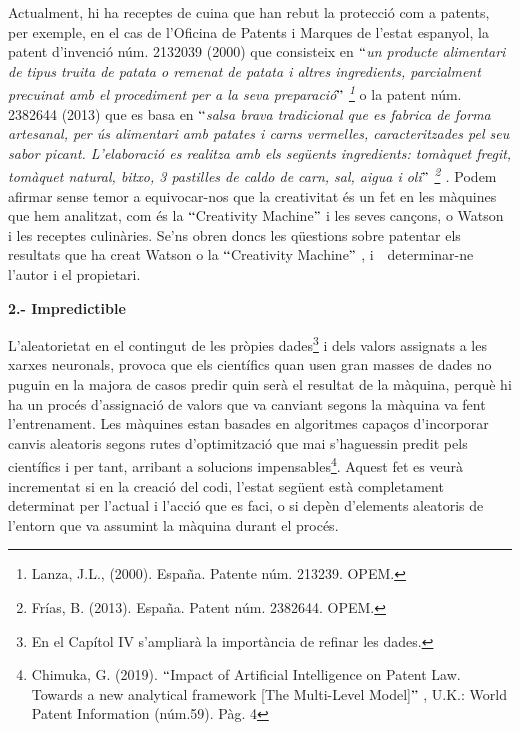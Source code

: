 \documentclass[12pt]{article}
\begin{document}
\vspace{\baselineskip}
Actualment, hi ha receptes de cuina que han rebut la protecció com a patents, per exemple, en el cas de l’Oficina de Patents i Marques de l’estat espanyol, la patent d’invenció núm. 2132039 (2000) que consisteix en \textit{$``$un producte alimentari de tipus truita de patata o remenat de patata i altres ingredients, parcialment precuinat amb el procediment per a la seva preparació$"$ \footnote{ Lanza, J.L., (2000). España. Patente núm. 213239. OPEM. } }o la patent núm. 2382644 (2013) que es basa en $``$\textit{salsa brava tradicional que es fabrica de forma artesanal, per ús alimentari amb patates i carns vermelles, caracteritzades pel seu sabor picant. L’elaboració es realitza amb els següents ingredients: tomàquet fregit, tomàquet natural, bitxo, 3 pastilles de caldo de carn, sal, aigua i oli$"$ \footnote{ Frías, B. (2013). España. Patent núm. 2382644. OPEM.  } . }Podem afirmar sense temor a equivocar-nos que la creativitat és un fet en les màquines que hem analitzat, com és la $``$Creativity Machine$"$  i les  seves cançons, o Watson i les receptes culinàries.\textit{ }Se’ns obren doncs les qüestions sobre patentar els resultats que ha creat Watson o la $``$Creativity Machine$"$ , i\ \ determinar-ne l’autor i  el propietari.\  \par


\vspace{\baselineskip}
\textbf{2.- Impredictible}\par


\vspace{\baselineskip}
L’aleatorietat en el contingut de les pròpies dades\footnote{ En el Capítol IV s’ampliarà la importància de refinar les dades. } i dels valors assignats a les xarxes neuronals, provoca que els científics quan usen gran masses de dades no puguin en la majora de casos predir quin serà el resultat de la màquina, perquè hi ha un procés d’assignació de valors que va canviant segons la màquina va fent l’entrenament. Les màquines estan basades en algoritmes capaços d’incorporar canvis aleatoris segons rutes d’optimització que mai s’haguessin predit pels científics i per tant, arribant a solucions impensables\footnote{ Chimuka, G. (2019). $``$Impact of Artificial Intelligence on Patent Law. Towards a new analytical framework [The Multi-Level Model]$"$ , U.K.: World Patent Information (núm.59). Pàg. 4 }. Aquest fet es veurà incrementat si en la creació del codi, l’estat següent està completament determinat per l’actual i l’acció que es faci, o si depèn d’elements aleatoris de l’entorn que va assumint la màquina durant el procés. \par
\end{document}
